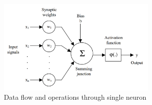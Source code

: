 \begin{figure}[H]
  \centering
  \includegraphics[width=0.7\textwidth]{figures/images/neuron.png}
  \caption[Single neuron]{Data flow and operations through single neuron \cite{csaji2001approximation}}
  \label{fig:neuron}
\end{figure}
